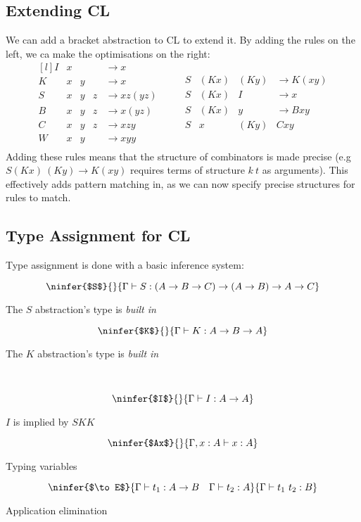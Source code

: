 \subsection{Extending CL}
We can add a bracket abstraction to CL to extend it.
By adding the rules on the left, we ca make the optimisations on the right:
\[\begin{matrix*}[l]
		I & x &   &   & \to x \\
		K & x & y &   & \to x \\
		S & x & y & z & \to xz(yz) \\
		B & x & y & z & \to x(yz) \\
		C & x & y & z & \to x z y \\
		W & x & y &   & \to x y y \\
	\end{matrix*} \qquad \begin{matrix}
		S & (K x) & (K y) & \to K(xy) \\
		S & (K x) & I     & \to x     \\
		S & (K x) & y     & \to B x y \\
		S & x     & (K y) & C x y     \\
	\end{matrix}\]
Adding these rules means that the structure of combinators is made precise (e.g $S (K x) \ (K y) \to K (x y)$ requires terms of structure $k \ t$ as arguments). This effectively adds pattern matching in, as we can now specify precise structures for rules to match.

\subsection{Type Assignment for CL}
Type assignment is done with a basic inference system:
\\ \begin{minipage}[b]{.5\textwidth}
	\[\ninfer{$S$}{}{\Gamma \vdash S: (A \to B \to C) \to (A \to B) \to A \to C}\]
	\centerline{The $S$ abstraction's type is \textit{built in}}
\end{minipage}
\begin{minipage}[b]{.5\textwidth}
	\[\ninfer{$K$}{}{\Gamma \vdash K : A \to B \to A}\]
	\centerline{The $K$ abstraction's type is \textit{built in}}
\end{minipage}
\\
\begin{minipage}[b]{.33\textwidth}
	\[\ninfer{$I$}{}{\Gamma \vdash I : A \to A}\]
	\centerline{$I$ is implied by $SKK$}
\end{minipage}
\begin{minipage}[b]{.33\textwidth}
	\[\ninfer{$Ax$}{}{\Gamma, x:A \vdash x : A}\]
	\centerline{Typing variables}
\end{minipage}
\begin{minipage}[b]{.33\textwidth}
	\[\ninfer{$\to E$}{\Gamma \vdash t_1 : A \to B \quad \Gamma \vdash t_2 : A}{\Gamma \vdash t_1 \ t_2 : B}\]
	\centerline{Application elimination}
\end{minipage}
